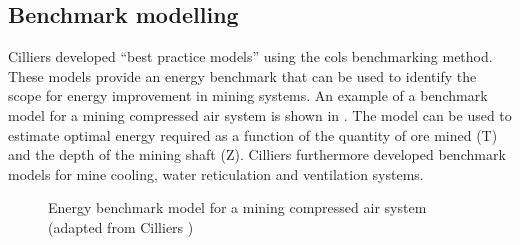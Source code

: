 	\subsection{Benchmark modelling}
		 Cilliers \cite{Cilliers2015PHD} developed \enquote{best practice models} using the \gls{cols} benchmarking method. These models provide an energy benchmark that can be used to identify the scope for energy improvement in mining systems. An example of a benchmark model for a mining compressed air system is shown in . The model can be used to estimate optimal energy required as a function of the quantity of ore mined (T) and the depth of the  mining shaft (Z). Cilliers furthermore developed benchmark models for mine cooling, water reticulation and ventilation systems.
		\begin{figure}[!htbp]
			\centering
			\fbox{\hspace{1.5cm}\hspace{1.5cm}}
			\caption[Energy benchmark model for a mining compressed air system]{Energy benchmark model for a mining compressed air system (adapted from Cilliers \cite{Cilliers2015PHD})}
			\label{fig: 3D Benchmark}
		\end{figure}
